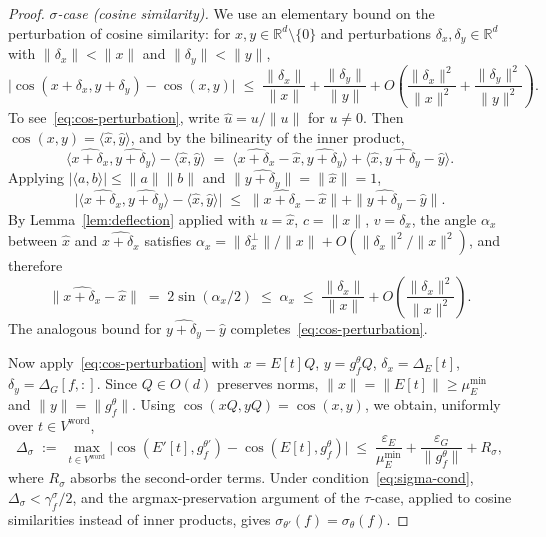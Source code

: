 \documentclass[11pt,letterpaper]{article}
\theoremstyle{definition}
\DeclareMathOperator{\cossim}{cos}
\begin{document}
\begin{proof}
\emph{$\sigma$-case (cosine similarity).} We use an elementary bound on the perturbation of cosine similarity: for $x, y \in \mathbb{R}^d \setminus \{0\}$ and perturbations $\delta_x, \delta_y \in \mathbb{R}^d$ with $\|\delta_x\| < \|x\|$ and $\|\delta_y\| < \|y\|$,
\begin{equation}
\big| \cossim(x + \delta_x, y + \delta_y) - \cossim(x, y) \big|
\;\leq\; \frac{\|\delta_x\|}{\|x\|} + \frac{\|\delta_y\|}{\|y\|} + O\!\left( \frac{\|\delta_x\|^2}{\|x\|^2} + \frac{\|\delta_y\|^2}{\|y\|^2} \right).
\label{eq:cos-perturbation}
\end{equation}
To see~\eqref{eq:cos-perturbation}, write $\hat{u} = u / \|u\|$ for $u \neq 0$. Then $\cossim(x, y) = \langle \hat{x}, \hat{y} \rangle$, and by the bilinearity of the inner product,
\[
\langle \widehat{x + \delta_x}, \widehat{y + \delta_y} \rangle - \langle \hat{x}, \hat{y} \rangle
\;=\; \langle \widehat{x + \delta_x} - \hat{x}, \widehat{y + \delta_y} \rangle + \langle \hat{x}, \widehat{y + \delta_y} - \hat{y} \rangle.
\]
Applying $|\langle a, b \rangle| \leq \|a\|\|b\|$ and $\|\widehat{y + \delta_y}\| = \|\hat{x}\| = 1$,
\[
\big| \langle \widehat{x + \delta_x}, \widehat{y + \delta_y} \rangle - \langle \hat{x}, \hat{y} \rangle \big|
\;\leq\; \|\widehat{x + \delta_x} - \hat{x}\| + \|\widehat{y + \delta_y} - \hat{y}\|.
\]
By Lemma~\ref{lem:deflection} applied with $u = \hat{x}$, $c = \|x\|$, $v = \delta_x$, the angle $\alpha_x$ between $\hat{x}$ and $\widehat{x + \delta_x}$ satisfies $\alpha_x = \|\delta_x^\perp\| / \|x\| + O(\|\delta_x\|^2 / \|x\|^2)$, and therefore
\[
\|\widehat{x + \delta_x} - \hat{x}\| \;=\; 2 \sin(\alpha_x / 2) \;\leq\; \alpha_x \;\leq\; \frac{\|\delta_x\|}{\|x\|} + O\!\left(\frac{\|\delta_x\|^2}{\|x\|^2}\right).
\]
The analogous bound for $\widehat{y + \delta_y} - \hat{y}$ completes~\eqref{eq:cos-perturbation}.

Now apply~\eqref{eq:cos-perturbation} with $x = E[t] Q$, $y = g_f^\theta Q$, $\delta_x = \Delta_E[t]$, $\delta_y = \Delta_G[f, :]$. Since $Q \in O(d)$ preserves norms, $\|x\| = \|E[t]\| \geq \mu_E^{\min}$ and $\|y\| = \|g_f^\theta\|$. Using $\cossim(xQ, yQ) = \cossim(x, y)$, we obtain, uniformly over $t \in V^{\mathrm{word}}$,
\[
\Delta_\sigma \;:=\; \max_{t \in V^{\mathrm{word}}} \big| \cossim(E'[t], g_f^{\theta'}) - \cossim(E[t], g_f^\theta) \big| \;\leq\; \frac{\varepsilon_E}{\mu_E^{\min}} + \frac{\varepsilon_G}{\|g_f^\theta\|} + R_\sigma,
\]
where $R_\sigma$ absorbs the second-order terms. Under condition~\eqref{eq:sigma-cond}, $\Delta_\sigma < \gamma_f^\sigma / 2$, and the argmax-preservation argument of the $\tau$-case, applied to cosine similarities instead of inner products, gives $\sigma_{\theta'}(f) = \sigma_\theta(f)$.
\end{proof}
\end{document}
